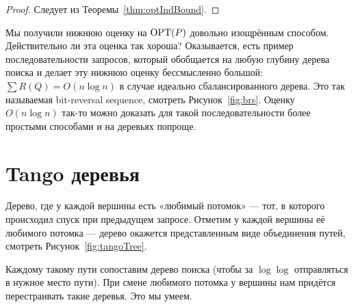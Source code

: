 \begin{proof}
Следует из Теоремы~\ref{thm:optIndBound}.
\end{proof}

Мы получили нижнюю оценку на $\operatorname{OPT}(P)$ довольно изощрённым способом. Действительно ли эта оценка так хороша? Оказывается, есть пример последовательности запросов, который обобщается на любую глубину дерева поиска и делает эту нижнюю оценку бессмысленно большой: $\sum R(Q) = O(n \log n)$ в случае идеально сбалансированного дерева. Это так называемая bit-reversal sequence, смотреть Рисунок~\ref{fig:brs}. Оценку $O(n \log n)$ так-то можно доказать для такой последовательности более простыми способами и на деревьях попроще.



\section{Tango деревья} 

Дерево, где у каждой вершины есть «любимый потомок» — тот, в которого происходил спуск при предыдущем запросе. Отметим у каждой вершины её любимого потомка — дерево окажется представленным виде объединения путей, смотреть Рисунок~\ref{fig:tangoTree}.



Каждому такому пути сопоставим дерево поиска (чтобы за $\log \log$ отправляться в нужное место пути). При смене любимого потомка у вершины нам придётся перестраивать такие деревья. Это мы умеем.